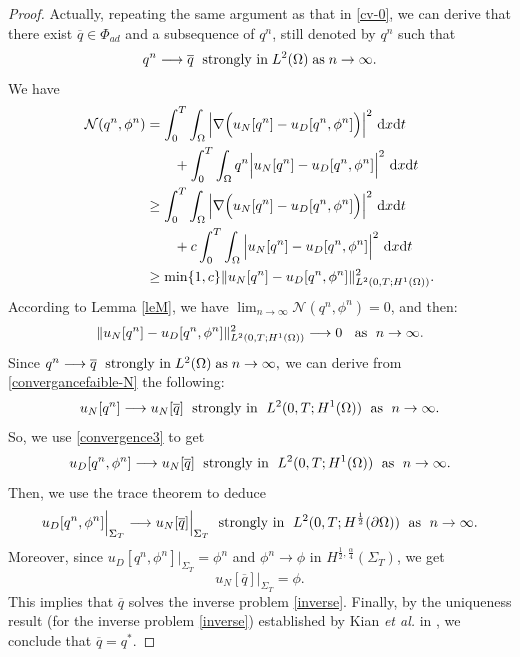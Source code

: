 \documentclass[a4paper,12pt,reqno,natbib]{amsart}
\newcommand{\dx} {\displaystyle\mathrm{d}x}
\newcommand{\dt} {\displaystyle\mathrm{d}t}
\def\ds{\displaystyle}
\begin{document}
{\begin{proof}
Actually, repeating the same argument as that in \eqref{cv-0}, we can derive that there exist $\overline{q}\in\Phi_{ad}$ and a subsequence of $q^n$, still denoted by $q^n$ such that
\begin{align*}%
q^n\longrightarrow \overline{q} \; \hbox{  strongly in}\; L^2(\Omega)\; \hbox{as}\; n\rightarrow\infty.
\end{align*}
We have
\begin{align*}
    \mathcal{N}(q^n,\phi^n) &=\ds\int_0^T \int_{\Omega}\Big|\nabla\Big(
 u_N[q^n]- u_D[q^n,\phi^n]\Big)\Big|^2\ \dx \dt \nonumber\\&\qquad+ \int_0^T \int_{\Omega}q^n\Big|
 u_N[q^n]- u_D[q^n,\phi^n]\Big|^2\ \dx\dt \notag\\
&\geq \ds\int_0^T \int_{\Omega}\Big|\nabla\Big(
 u_N[q^n]- u_D[q^n,\phi^n]\Big)\Big|^2\ \dx \dt  \nonumber\\&\qquad+c \int_0^T \int_{\Omega}\Big|
 u_N[q^n]- u_D[q^n,\phi^n]\Big|^2\ \dx \dt\notag\\
&\geq \min\{1,c\} \| u_N[q^n]- u_D[q^n,\phi^n]\|_{L^2(0,T;H^1(\Omega))}^2. %
\end{align*} 
According to Lemma \ref{leM}, we have $\displaystyle\lim_{n\to\infty}\mathcal{N}(q^n,\phi^n)=0$, and then:
\begin{align}\label{convergence3}
\| u_N[q^n]- u_D[q^n,\phi^n]\|_{L^2(0,T;H^1(\Omega))}^2 \longrightarrow 0 \; \; \hbox{  as  } \; n \rightarrow \infty.
\end{align}
Since $q^n\longrightarrow \overline{q} \; \hbox{  strongly in}\; L^2(\Omega)\; \hbox{as}\; n\rightarrow\infty,$ we can derive from \eqref{convergancefaible-N} the following:
\begin{equation*} 
    u_N[q^n]\longrightarrow u_N[\overline{q}]\; \hbox{ strongly in }\; L^2(0,T;H^1(\Omega))\; \hbox{ as }\; n\to\infty. 
\end{equation*}
So, we use \eqref{convergence3} to get
\begin{equation*}
    u_D[q^n,\phi^n]\longrightarrow u_N[\overline{q}]\; \hbox{ strongly in }\; L^2(0,T;H^1(\Omega))\; \hbox{ as }\; n\to\infty. 
\end{equation*}
Then, we use the trace theorem to deduce
\begin{equation*}
    u_D[q^n,\phi^n]\Big|_{\Sigma_T}\longrightarrow u_N[\overline{q}]\Big|_{\Sigma_T}\; \hbox{ strongly in }\; L^2(0,T;H^\frac{1}{2}(\partial\Omega))\; \hbox{ as }\; n\to\infty. 
\end{equation*}
Moreover, since $ u_D[q^n,\phi^n]\Big|_{\Sigma_T}= \phi^n $ and $ \phi^n \longrightarrow \phi $ in $H^{\frac{1}{2},\frac{\alpha}{4} }\left(\Sigma_{T}\right)$, 
we get
\begin{equation*}
     u_N[\overline{q}]\Big|_{\Sigma_T} = \phi.
\end{equation*} 
This implies that $\overline{q}$ solves the inverse problem \eqref{inverse}. Finally, by the uniqueness result (for the inverse problem \eqref{inverse}) established by Kian \emph{et al.} in \cite{Kain2021MA}, we conclude that $\overline{q}=q^*$.
\end{proof}

}
\end{document}
